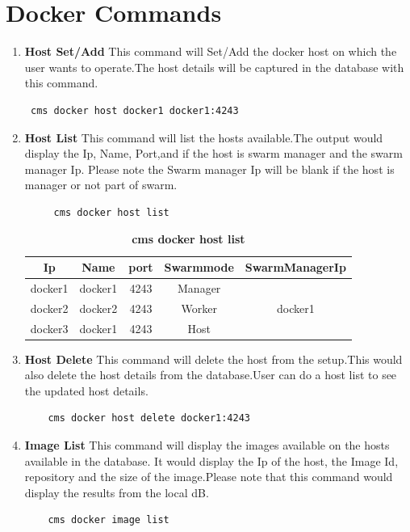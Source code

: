 \documentclass[9pt,twocolumn,twoside]{../../styles/osajnl}
\begin{document}
\section{Docker Commands}
\begin{enumerate}
    \item\textbf{Host Set/Add}
     This command will Set/Add the docker host on which the user wants to operate.The host details will be captured in the database with this command.
    \begin{verbatim} cms docker host docker1 docker1:4243 \end{verbatim}
    
    \item \textbf{Host List}
     This command will list the hosts available.The output would display the Ip, Name, Port,and if the host is swarm manager and the swarm manager Ip. Please note the Swarm manager Ip will be blank if the host is manager or not part of swarm. 
     \begin{verbatim}
     cms docker host list 
     \end{verbatim}
     
     \begin{table}[h!]
     \caption{\bf cms docker host list }
     \begin{tabular}{ccccc}
     \hline
      Ip & Name & port & Swarmmode &SwarmManagerIp\\
      \hline
      docker1 & docker1 & 4243 & Manager & \\
      docker2 & docker2 & 4243 & Worker & docker1\\
      docker3 & docker1 & 4243 & Host & \\
     \hline
     \end{tabular}
     \label{tab:tab1}
     \end{table}
     
    \item \textbf{Host Delete}
    This command will delete the host from the setup.This would also delete the host details from the database.User can do a host list to see the updated host details.\\
    \begin{verbatim}
    cms docker host delete docker1:4243
    \end{verbatim}
    
    \item \textbf{Image List}
    This command will display the images available on the hosts available in the database.
    It would display the Ip of the host, the Image Id, repository and the size of the image.Please note that this command would display the results from the local dB.\\
    \begin{verbatim}
    cms docker image list
    \end{verbatim}
    

\end{enumerate}
\end{document}
